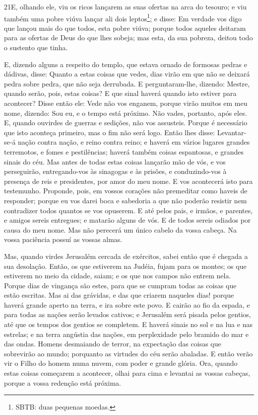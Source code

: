 \medskip

\lettrine{21} E, olhando ele, viu os ricos lançarem as suas
ofertas na arca do tesouro; e viu também uma pobre viúva lançar
ali dois leptos\footnote{SBTB: duas pequenas moedas.}; e disse:
Em verdade vos digo que lançou mais do que todos, esta pobre viúva;
porque todos aqueles deitaram para as ofertas de Deus do que
lhes sobeja; mas esta, da sua pobreza, deitou todo o sustento que
tinha.

E, dizendo alguns a respeito do templo, que estava ornado de
formosas pedras e dádivas, disse: Quanto a estas coisas que
vedes, dias virão em que não se deixará pedra sobre pedra, que não
seja derrubada. E perguntaram-lhe, dizendo: Mestre, quando
serão, pois, estas coisas? E que sinal haverá quando isto estiver
para acontecer? Disse então ele: Vede não vos enganem, porque
virão muitos em meu nome, dizendo: Sou eu, e o tempo está próximo.
Não vades, portanto, após eles. E, quando ouvirdes de guerras e
sedições, não vos assusteis. Porque é necessário que isto aconteça
primeiro, mas o fim não será logo. Então lhes disse:
Levantar-se-á nação contra nação, e reino contra reino; e
haverá em vários lugares grandes terremotos, e fomes e pestilências;
haverá também coisas espantosas, e grandes sinais do céu. Mas
antes de todas estas coisas lançarão mão de vós, e vos perseguirão,
entregando-vos às sinagogas e às prisões, e conduzindo-vos à
presença de reis e presidentes, por amor do meu nome. E vos
acontecerá isto para testemunho. Proponde, pois, em vossos
corações não premeditar como haveis de responder; porque eu
vos darei boca e sabedoria a que não poderão resistir nem
contradizer todos quantos se vos opuserem. E até pelos pais,
e irmãos, e parentes, e amigos sereis entregues; e matarão alguns de
vós. E de todos sereis odiados por causa do meu nome.
Mas não perecerá um único cabelo da vossa cabeça. Na
vossa paciência possuí as vossas almas.

Mas, quando virdes Jerusalém cercada de exércitos, sabei então
que é chegada a sua desolação. Então, os que estiverem na
Judéia, fujam para os montes; os que estiverem no meio da cidade,
saiam; e os que nos campos não entrem nela. Porque dias de
vingança são estes, para que se cumpram todas as coisas que estão
escritas. Mas ai das grávidas, e das que criarem naqueles
dias! porque haverá grande aperto na terra, e ira sobre este povo.
E cairão ao fio da espada, e para todas as nações serão
levados cativos; e Jerusalém será pisada pelos gentios, até que os
tempos dos gentios se completem. E haverá sinais no sol e na
lua e nas estrelas; e na terra angústia das nações, em perplexidade
pelo bramido do mar e das ondas. Homens desmaiando de terror,
na expectação das coisas que sobrevirão ao mundo; porquanto as
virtudes do céu serão abaladas. E então verão vir o Filho do
homem numa nuvem, com poder e grande glória. Ora, quando
estas coisas começarem a acontecer, olhai para cima e levantai as
vossas cabeças, porque a vossa redenção está próxima.

